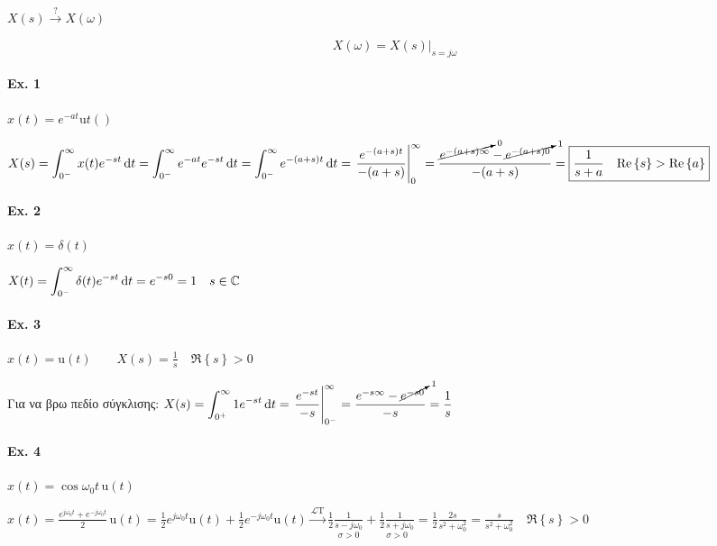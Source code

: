     \paragraph{}
    \( \displaystyle X(s) \xrightarrow{?} X(\omega ) \)
    
    \[
    X(\omega ) = \left. X(s)\right|_{s=j\omega }
    \]
    
    \paragraph{Ex. 1}
    \( x(t)= e^{-at}\mathrm ut() \)
    
    \( \displaystyle
    X(s) = \int_{0^-}^\infty x(t)e^{-st}\dif t
    =\int_{0^-}^\infty e^{-at}e^{-st}\dif t
    = \int_{0^-}^\infty e^{-(a+s)t}\dif t
    =\left. \frac{e^{-(a+s)t}}{-(a+s)}\right|_0^\infty
    = \frac{\cancelto{0}{e^{-(a+s)\infty}} -\cancelto{1}{e^{-(a+s)0}} }{-(a+s)}
    = \boxed{\frac{1}{s+a} \quad 
        \Re\left\lbrace s \right\rbrace > \Re\left\lbrace a \right\rbrace}
     \)
     
     
   \paragraph{Ex. 2}
   \( x(t)=\delta(t) \)
   
   \( \displaystyle
   X(t) = \int_{0^-}^\infty \delta(t)e^{-st}\dif t = e^{-s0} = 1 \quad s\in\mathbb C 
    \)
    
   \paragraph{Ex. 3}
   \( x(t)=\mathrm u(t) \qquad X(s)=\frac{1}{s} 
   \quad \Re\left\lbrace s \right\rbrace > 0\)
   
   Για να βρω πεδίο σύγκλισης: \( \displaystyle
   X(s) =
   \int_{0^+}^\infty 1e^{-st}\dif t = \left.
   \frac{e^{-st}}{-s}\right|_{0^-}^\infty
   = \frac{e^{-s\infty}-\cancelto{1}{e^{-s0}}}{-s}=\frac{1}{s}
    \)
    
   \paragraph{Ex. 4}
   \( x(t)=\cos\omega_0 t\, \mathrm u(t) \)
   
   \( \displaystyle
   x(t) = \frac{e^{j\omega_0 t}+e^{-j\omega_0 t}}{2}\, \mathrm u(t)
   =\frac{1}{2}e^{j\omega_0 t}\mathrm u(t)
   +\frac{1}{2}e^{-j\omega_0 t}\mathrm u(t)
   \xrightarrow{\mathscr L \mathrm T}
    \frac{1}{2}
    \underset{\sigma >0}{\frac{1}{s-j\omega_0}}+
    \underset{\sigma >0}{\frac{1}{2}\frac{1}{s+j\omega_0}}
    = \frac{1}{2} \frac{2s}{s^2+\omega_0^2}
    =\frac{s}{s^2+\omega_0^2} \quad \Re\left\lbrace s \right\rbrace>0
    \)
    
